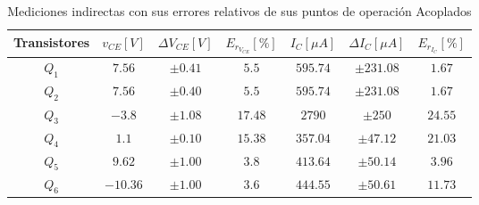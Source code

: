 \begin{enumerate}
\begin{itemize}
                \begin{table}[H]
                  \centering
                  \begin{tabular}{|c|c|c|c|c|c|c|}
                    \hline
                    \textbf{Transistores} & $v_{CE} [V]$ & $\Delta V_{CE} [V]$ & $E_{r_{V_{CE}}} [\%]$ & $I_{C} [\mu A]$ & $\Delta I_{C} [\mu A]$ & $E_{r_{I_{C}}} [\%]$ \\
                    \hline
                    $Q_1$                 & $7.56$       & $\pm 0.41 $         & $5.5$                 & $595.74$        & $\pm 231.08$           & $1.67$               \\
                    \hline
                    $Q_2$                 & $7.56$       & $\pm 0.40 $         & $5.5$                 & $595.74$        & $\pm 231.08$           & $1.67$               \\
                    \hline
                    $Q_3$                 & $-3.8$       & $\pm 1.08$          & $17.48$               & $2790$          & $\pm 250$              & $24.55$              \\
                    \hline
                    $Q_4$                 & $1.1$        & $\pm 0.10$          & $15.38$               & $357.04$        & $\pm 47.12$            & $21.03$              \\
                    \hline
                    $Q_5$                 & $9.62$       & $\pm 1.00$          & $3.8$                 & $413.64$        & $\pm 50.14$            & $3.96$               \\
                    \hline
                    $Q_6$                 & $-10.36$     & $\pm 1.00$          & $3.6$                 & $444.55$        & $\pm 50.61$            & $11.73$              \\
                    \hline
                  \end{tabular}
                  \caption{Mediciones indirectas con sus errores relativos de sus puntos de operación Acoplados}
                  \label{tab:puntos_operacion_experimental_maserror_parte3}
                \end{table}


\end{itemize}
\end{enumerate}

